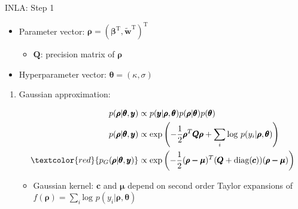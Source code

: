 \documentclass{beamer}
\begin{document}
\begin{frame}{INLA: Step 1}{}
  \begin{itemize}
  \addtolength{\itemsep}{0.5\baselineskip}
  \item Parameter vector: $\pmb{\rho} = ( \pmb{\beta}^{\text{T}}, \widetilde{\pmb{w}}^{\text{T}} )^{\text{T}}$
              \begin{itemize}
              \addtolength{\itemsep}{0.5\baselineskip}
              \item $\pmb{Q}$: precision matrix of $\pmb{\rho}$
              \end{itemize}
  \item Hyperparameter vector: $\pmb{\theta} = (\kappa, \sigma )$
  \end{itemize}

\begin{enumerate}
\item Gaussian approximation:

    \begin{align}
    p(\pmb{\rho} |\pmb{\theta},\pmb{y}) & \propto p(\pmb{y}|\pmb{\rho}, \pmb{\theta}) p(\pmb{\rho}|\pmb{\theta}) p(\pmb{\theta}) \nonumber \\
    p(\pmb{\rho}|\pmb{\theta},\pmb{y}) & \propto \text{exp}\left(-\frac{1}{2}\pmb{\rho}^{T}\pmb{Q \rho} + \sum_{i} \text{log }p(y_{i}|\pmb{\rho},\pmb{\theta}) \right) \nonumber \\
    \textcolor{red}{p_{G}(\pmb{\rho}|\pmb{\theta}, \pmb{y})} & \propto \text{exp} \left( -\frac{1}{2}(\pmb{\rho-\mu})^{T} (\pmb{Q} + \text{diag}(\pmb{c}) ) (\pmb{\rho - \mu}) \right) \nonumber
    \end{align}

    \begin{itemize}
    \item Gaussian kernel: $\pmb{c}$ and $\pmb{\mu}$ depend on second order Taylor expansions of $f(\pmb{\rho}) = \sum_{i} \text{log }p(y_{i}|\pmb{\rho},\pmb{\theta})$
    \end{itemize}

\end{enumerate}
\end{frame}
\end{document}
